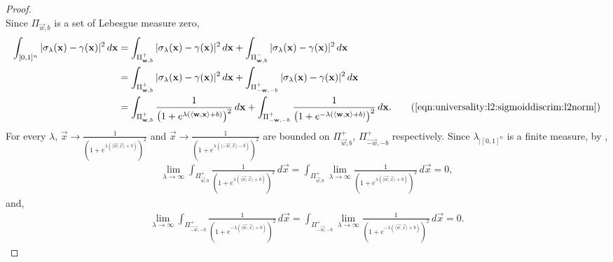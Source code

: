 \begin{proof}
\begin{equation*}
  \end{equation*}
Since $\Pi_{\vec{w}, b}$ is a set of Lebesgue measure zero, 
\begin{subequations}\label{eqn:universality:l2:sigmoiddiscrim:l2norm}
\begin{align*}
    \int_{[0,1]^n} |\sigma_\lambda(\vec{x}) - \gamma(\vec{x})|^2 \, d\vec{x} &=  \int_{\Pi_{\vec{w}, b}^{+}} |\sigma_\lambda(\vec{x}) - \gamma(\vec{x})|^2 \, d\vec{x} +  \int_{\Pi_{\vec{w}, b}^{-}} |\sigma_\lambda(\vec{x}) - \gamma(\vec{x})|^2 \, d\vec{x} \\
    &= \int_{\Pi_{\vec{w}, b}^{+}} |\sigma_\lambda(\vec{x}) - \gamma(\vec{x})|^2 \, d\vec{x} + \int_{\Pi_{-\vec{w}, -b}^{+}} |\sigma_\lambda(\vec{x}) - \gamma(\vec{x})|^2 \, d\vec{x} \\ 
    &= \int_{\Pi_{\vec{w}, b}^{+}} \frac{1}{\left (  1 + e^{\lambda ( \langle \vec{w}, \vec{x} \rangle + b ) } \right)^2 } \, d\vec{x} + \int_{\Pi_{-\vec{w}, -b}^{+}} \frac{1}{\left ( 1 + e^{-\lambda ( \langle \vec{w}, \vec{x} \rangle + b ) } \right)^2} \, d\vec{x}.
     \tag{\ref{eqn:universality:l2:sigmoiddiscrim:l2norm}} 
\end{align*}
\end{subequations}
\newpage
For every $ \lambda$, $\vec{x} \to \frac{1}{\left ( 1 + e^{\lambda ( \langle \vec{w}, \vec{x} \rangle + b ) } \right)^2}$ and $\vec{x} \to \frac{1}{\left ( 1 + e^{\lambda ( \langle -\vec{w}, \vec{x} \rangle - b ) } \right)^2}$  are bounded on $\Pi_{\vec{w}, b}^{+}$, $\Pi_{\vec{-w}, -b}^{+}$ respectively.
Since $\lambda_{|[0,1]^n}$ is a finite measure, by , 
\begin{align}
    \label{eqn:universality:l2:sigmoiddiscrim:dct1}
    \lim_{\lambda \to \infty} \int_{\Pi_{\vec{w}, b}^{+}} \frac{1} {\left (  1 + e^{\lambda ( \langle \vec{w}, \vec{x} \rangle + b ) } \right)^2 } \, d\vec{x} =  \int_{\Pi_{\vec{w}, b}^{+}} \lim_{\lambda \to \infty}  \frac{1} {\left (  1 + e^{\lambda ( \langle \vec{w}, \vec{x} \rangle + b ) } \right)^2 } \, d\vec{x} = 0,
\end{align}
and,
\begin{align}
    \label{eqn:universality:l2:sigmoiddiscrim:dct2}
    \lim_{\lambda \to \infty} \int_{\Pi_{\vec{-w}, -b}^{+}} \frac{1} {\left (  1 + e^{-\lambda ( \langle \vec{w}, \vec{x} \rangle + b )  } \right)^2 } \, d\vec{x} =  \int_{\Pi_{-\vec{w}, -b}^{+}} \lim_{\lambda \to \infty}  \frac{1} {\left (  1 + e^{-\lambda ( \langle \vec{w}, \vec{x} \rangle + b )  } \right)^2 } \, d\vec{x} = 0.
\end{align}

\end{proof}
